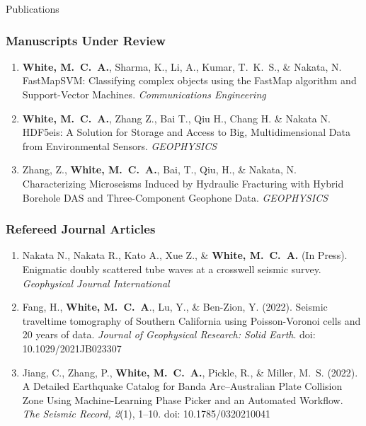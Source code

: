 \begin{rSection}{Publications}
	\subsubsection*{Manuscripts Under Review}
	\begin{enumerate}
		\item \textbf{White, M.~C.~A.}, Sharma, K., Li, A., Kumar, T.~K.~S., \& Nakata, N. FastMapSVM: Classifying complex objects using the FastMap algorithm and Support-Vector Machines. \textit{Communications Engineering}
		
		\item \textbf{White, M.~C.~A.}, Zhang Z., Bai T., Qiu H., Chang H. \& Nakata N. HDF5eis: A Solution for Storage and Access to Big, Multidimensional Data from Environmental Sensors. \textit{GEOPHYSICS}
		
		\item Zhang, Z., \textbf{White, M.~C.~A.}, Bai, T., Qiu, H., \& Nakata, N. Characterizing Microseisms Induced by Hydraulic Fracturing with Hybrid Borehole DAS and Three-Component Geophone Data. \textit{GEOPHYSICS}
	\end{enumerate}
	\subsubsection*{Refereed Journal Articles}
		\begin{enumerate}
					
		\item Nakata N., Nakata R., Kato A., Xue Z., \& \textbf{White, M.~C.~A.} (In Press). Enigmatic doubly scattered tube waves at a crosswell seismic survey. \textit{Geophysical Journal International}
			
		\item Fang, H., \textbf{White, M.~C.~A}., Lu, Y., \& Ben-Zion, Y. (2022). Seismic traveltime tomography of Southern California using Poisson-Voronoi cells and 20 years of data. \textit{Journal of Geophysical Research: Solid Earth}. doi: 10.1029/2021JB023307
		
		
		\item Jiang, C., Zhang, P., \textbf{White, M.~C.~A.}, Pickle, R., \& Miller, M.~S. (2022). A Detailed Earthquake Catalog for Banda Arc–Australian Plate Collision Zone Using Machine-Learning Phase Picker and an Automated Workflow. \textit{The Seismic Record, 2}(1), 1–10. doi: 10.1785/0320210041
		

\end{enumerate}
\end{rSection}
